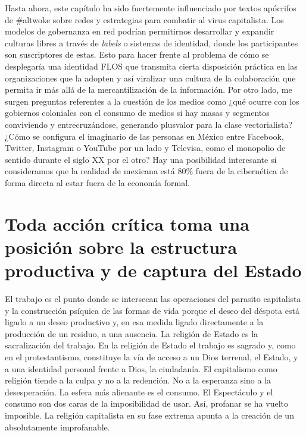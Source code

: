 Hasta ahora, este capítulo ha sido fuertemente influenciado por textos apócrifos de \#altwoke sobre redes y estrategias para combatir al virus capitalista. Los modelos de gobernanza en red podrían permitirnos desarrollar y expandir culturas libres a través de \emph{labels} o sistemas de identidad, donde los participantes son suscriptores de estas. Esto para hacer frente al problema de cómo se desplegaría una identidad FLOS que transmita cierta disposición práctica en las organizaciones que la adopten y así viralizar una cultura de la colaboración que permita ir más allá de la mercantilización de la información. Por otro lado, me surgen preguntas referentes a la cuestión de los medios como ¿qué ocurre con los gobiernos coloniales con el consumo de medios si hay masas y segmentos conviviendo y entrecruzándose, generando plusvalor para la clase vectorialista? ¿Cómo se configura el imaginario de las personas en México entre Facebook, Twitter, Instagram o YouTube por un lado y Televisa, como el monopolio de sentido durante el siglo XX por el otro? Hay una posibilidad interesante si consideramos que la realidad de mexicana está 80\% fuera de la cibernética de forma directa al estar fuera de la economía formal.

\section{Toda acción crítica toma una posición sobre la estructura productiva y de captura del Estado}
\label{sec:toda-acción-crítica}

El trabajo es el punto donde se intersecan las operaciones del parasito capitalista y la construcción psíquica de las formas de vida porque el deseo del déspota está ligado a un deseo productivo y, en esa medida ligado directamente a la producción de un residuo, a una ausencia. La religión de Estado es la sacralización del trabajo. En la religión de Estado el trabajo es sagrado y, como en el protestantismo, constituye la vía de acceso a un Dios terrenal, el Estado, y a una identidad personal frente a Dios, la ciudadanía. El capitalismo como religión tiende a la culpa y no a la redención. No a la esperanza sino a la desesperación. La esfera más alienante es el consumo. El Espectáculo y el consumo son dos caras de la imposibilidad de usar. Así, profanar se ha vuelto imposible. La religión capitalista en su fase extrema apunta a la creación de un absolutamente improfanable.


